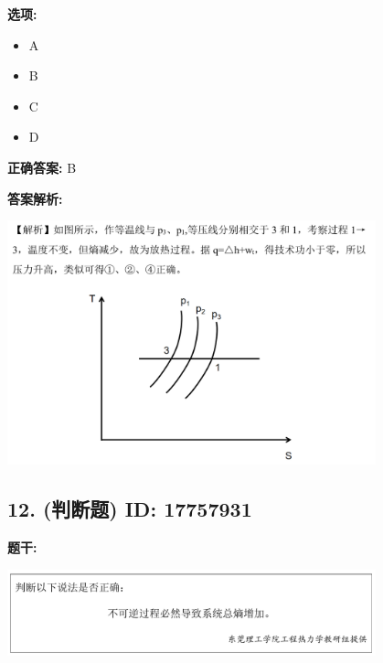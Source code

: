 \documentclass[12pt]{article}
\begin{document}
\textbf{选项:}
\begin{itemize}[leftmargin=*]
  \item A

  \item B

  \item C

  \item D

\end{itemize}

\textbf{正确答案:}
B

\textbf{答案解析:}


\begin{center}\includegraphics[width=0.8\textwidth, height=0.25\textheight, keepaspectratio]{question_11_17757923/correct_replay_img_1.png}\end{center}

\vspace{0.5em}\hrulefill\vspace{1em}

\subsection*{12. (判断题) \small ID: 17757931}

\textbf{题干:}


\begin{center}\includegraphics[width=0.8\textwidth, height=0.25\textheight, keepaspectratio]{question_12_17757931/title_img_1.png}\end{center}
\end{document}
